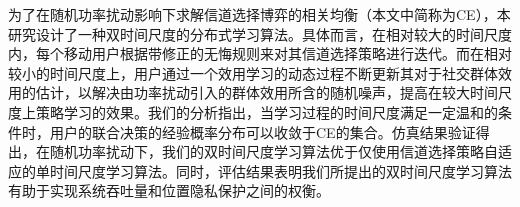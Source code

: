 为了在随机功率扰动影响下求解信道选择博弈的相关均衡（本文中简称为CE），本研究设计了一种双时间尺度的分布式学习算法。具体而言，在相对较大的时间尺度内，每个移动用户根据{\kaishu 带修正的无悔规则}\cite{Hart_areinforcement}来对其信道选择策略进行迭代。而在相对较小的时间尺度上，用户通过一个效用学习的动态过程不断更新其对于社交群体效用的估计，以解决由功率扰动引入的群体效用所含的随机噪声，提高在较大时间尺度上策略学习的效果。我们的分析指出，当学习过程的时间尺度满足一定温和的条件时，用户的联合决策的经验概率分布可以收敛于CE的集合。仿真结果验证得出，在随机功率扰动下，我们的双时间尺度学习算法优于仅使用信道选择策略自适应的单时间尺度学习算法。同时，评估结果表明我们所提出的双时间尺度学习算法有助于实现系统吞吐量和位置隐私保护之间的权衡。


